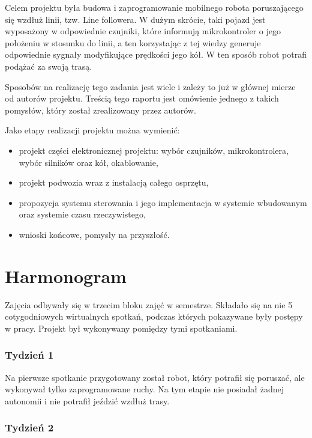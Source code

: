 \documentclass[11pt]{article}
\begin{document}
Celem projektu była budowa i zaprogramowanie mobilnego robota poruszającego się wzdłuż linii, tzw. Line followera.
W dużym skrócie, taki pojazd jest wyposażony w odpowiednie czujniki, które informują mikrokontroler o jego położeniu w stosunku do linii, a ten korzystając z tej wiedzy generuje odpowiednie sygnały modyfikujące prędkości jego kół.
W ten sposób robot potrafi podążać za swoją trasą.

Sposobów na realizację tego zadania jest wiele i zależy to już w głównej mierze od autorów projektu. Treścią tego raportu jest omówienie jednego z takich pomysłów, który został zrealizowany przez autorów.

Jako etapy realizacji projektu można wymienić:
\begin{itemize}
\item projekt części elektronicznej projektu: wybór czujników, mikrokontrolera, wybór silników oraz kół, okablowanie,
\item projekt podwozia wraz z instalacją całego osprzętu,
\item propozycja systemu sterowania i jego implementacja w systemie wbudowanym oraz systemie czasu rzeczywistego,
\item wnioski końcowe, pomysły na przyszłość.
\end{itemize}
 


\newpage

\section{Harmonogram}

Zajęcia odbywały się w trzecim bloku zajęć w semestrze. Składało się na nie 5 cotygodniowych wirtualnych spotkań, podczas których pokazywane były postępy w pracy. Projekt był wykonywany pomiędzy tymi spotkaniami.

\subsubsection*{Tydzień 1}

Na pierwsze spotkanie przygotowany został robot, który potrafił się poruszać, ale wykonywał tylko zaprogramowane ruchy. Na tym etapie nie posiadał żadnej autonomii i nie potrafił jeździć wzdłuż trasy.

\subsubsection*{Tydzień 2}
\end{document}
